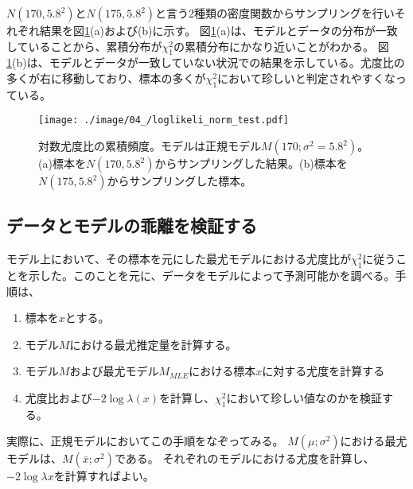 $N(170,5.8^2)$と$N(175,5.8^2)$と言う2種類の密度関数からサンプリングを行いそれぞれ結果を図\ref{fig:loglikelihood_test_simulation_norm}(a)および(b)に示す。
図\ref{fig:loglikelihood_test_simulation_norm}(a)は、モデルとデータの分布が一致していることから、累積分布が$\chi^2_1$の累積分布にかなり近いことがわかる。
図\ref{fig:loglikelihood_test_simulation_norm}(b)は、モデルとデータが一致していない状況での結果を示している。尤度比の多くが右に移動しており、標本の多くが$\chi^2_1$において珍しいと判定されやすくなっている。


\begin{figure}
    \begin{center}
        \texttt{[image: ./image/04\_/loglikeli\_norm\_test.pdf]}
        \caption{対数尤度比の累積頻度。モデルは正規モデル$M(170;\sigma^2=5.8^2)$。(a)標本を$N(170,5.8^2)$からサンプリングした結果。(b)標本を$N(175,5.8^2)$からサンプリングした標本。}
        \label{fig:loglikelihood_test_simulation_norm}

      \end{center}
    \end{figure}

\subsection{データとモデルの乖離を検証する}
モデル上において、その標本を元にした最尤モデルにおける尤度比が$\chi^2_1$に従うことを示した。このことを元に、データをモデルによって予測可能かを調べる。手順は、
\begin{enumerate}
    \item 標本を$x$とする。
    \item モデル$M$における最尤推定量を計算する。
    \item モデル$M$および最尤モデル$M_{MLE}$における標本$x$に対する尤度を計算する
    \item 尤度比および$-2\log\lambda(x)$を計算し、$\chi^2_1$において珍しい値なのかを検証する。
\end{enumerate}
実際に、正規モデルにおいてこの手順をなぞってみる。
$M(\mu;\sigma^2)$における最尤モデルは、$M(\bar{x};\sigma^2)$である。
それぞれのモデルにおける尤度を計算し、$-2\log\lambda{x}$を計算すればよい。


